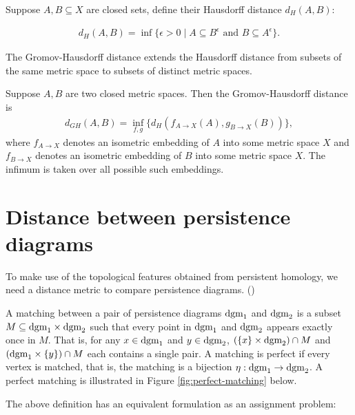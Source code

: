 \begin{defn}
    Suppose $A, B \subseteq X$ are closed sets, define their Hausdorff distance $d_H(A, B)$:
    
    \begin{align}
        d_H(A, B) =\inf\{\epsilon >0 \mid A\subseteq B^\epsilon \text{ and } B\subseteq A^\epsilon\}.
    \end{align}
\end{defn}

\begin{defn}
The Gromov-Hausdorff distance extends the Hausdorff distance from subsets of the same metric space to subsets of distinct metric spaces.

Suppose $A, B$ are two closed metric spaces. Then the Gromov-Hausdorff distance is 
    \begin{align}
        d_{GH}(A,B) =\inf_{f,g}\{d_H(f_{A\to X}(A), g_{B\to X}(B))\},
    \end{align}
where $f_{A\to X}$ denotes an isometric embedding of $A$ into some metric space $X$ and $f_{B\to X}$ denotes an isometric embedding of $B$ into some metric space $X$. The infimum is taken over all possible such embeddings. 
\end{defn}

\section{Distance between persistence diagrams}
To make use of the topological features obtained from persistent homology, we need a distance metric to compare persistence diagrams. (\cite{kerber_geometry_2016})

\begin{defn}
A matching between a pair of persistence diagrams $\text{dgm}_1$ and $\text{dgm}_2$ is a subset $M\subseteq \text{dgm}_1 \times \text{dgm}_2$ such that every point in $\text{dgm}_1 $ and $\text{dgm}_2$ appears exactly once in $M$. That is, for any $x\in \text{dgm}_1$ and $y \in \text{dgm}_2$, $(\{x\} \times \text{dgm}_2) \cap M$ and $(\text{dgm}_1 \times \{y\}) \cap M$ each contains a single pair. A matching is
perfect if every vertex is matched, that is, the matching is a bijection $\eta: \text{dgm}_1 \to \text{dgm}_2$. A perfect matching is illustrated in Figure \ref{fig:perfect-matching} below.
\end{defn}

The above definition has an equivalent formulation as an assignment problem:

